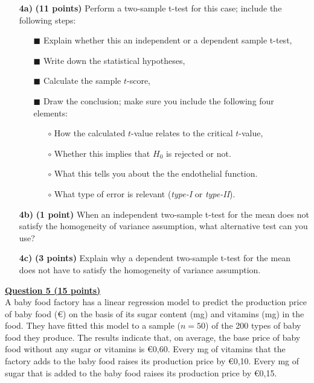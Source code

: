 \begin{itemize}

    \item[\textbf{4a)}] \textbf{(11 points)} Perform a two-sample t-test for this case; include the following steps: 
    \begin{itemize}
        \item[$\blacksquare$] Explain whether this an independent or a dependent sample t-test,
        \item[$\blacksquare$] Write down the statistical hypotheses, 
        \item[$\blacksquare$] Calculate the sample $t$-score,
        \item[$\blacksquare$] Draw the conclusion; make sure you include the following four elements: 
        \begin{itemize}
            \item[$\circ$] How the calculated $t$-value relates to the critical $t$-value,
            \item[$\circ$] Whether this implies that $H_0$ is rejected or not.
            \item[$\circ$] What this tells you about the the endothelial function.
            \item[$\circ$] What type of error is relevant (\textit{type-I} or \textit{type-II}).
        \end{itemize}
    \end{itemize}
    
    \item[\textbf{4b)}] \textbf{(1 point)} When an independent two-sample t-test for the mean does not satisfy the homogeneity of variance assumption, what alternative test can you use?
    
    \item[\textbf{4c)}] \textbf{(3 points)} Explain why a dependent two-sample t-test for the mean does not have to satisfy the homogeneity of variance assumption.
    
\end{itemize}

\underline{\textbf{Question 5 (15 points)}} \\

A baby food factory has a linear regression model to predict the production price of baby food (\euro) on the basis of its sugar content (mg) and vitamins (mg) in the food. They have fitted this model to a sample ($n = 50$) of the 200 types of baby food they produce. The results indicate that, on average, the base price of baby food without any sugar or vitamins is \euro 0,60. Every mg of vitamins that the factory adds to the baby food raises its production price by \euro 0,10. Every mg of sugar that is added to the baby food raises its production price by \euro 0,15. 

